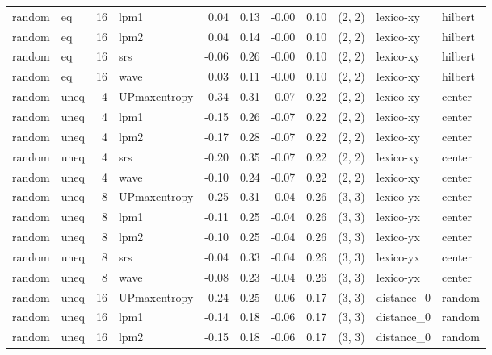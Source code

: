 \begin{tabular}{llrlrrrrlll}
random &    eq & 16 &         lpm1 &  0.04 &     0.13 &  -0.00 &       0.10 & (2, 2) &   lexico-xy &    hilbert \\
random &    eq & 16 &         lpm2 &  0.04 &     0.14 &  -0.00 &       0.10 & (2, 2) &   lexico-xy &    hilbert \\
random &    eq & 16 &          srs & -0.06 &     0.26 &  -0.00 &       0.10 & (2, 2) &   lexico-xy &    hilbert \\
random &    eq & 16 &         wave &  0.03 &     0.11 &  -0.00 &       0.10 & (2, 2) &   lexico-xy &    hilbert \\
random &  uneq &  4 & UPmaxentropy & -0.34 &     0.31 &  -0.07 &       0.22 & (2, 2) &   lexico-xy &     center \\
random &  uneq &  4 &         lpm1 & -0.15 &     0.26 &  -0.07 &       0.22 & (2, 2) &   lexico-xy &     center \\
random &  uneq &  4 &         lpm2 & -0.17 &     0.28 &  -0.07 &       0.22 & (2, 2) &   lexico-xy &     center \\
random &  uneq &  4 &          srs & -0.20 &     0.35 &  -0.07 &       0.22 & (2, 2) &   lexico-xy &     center \\
random &  uneq &  4 &         wave & -0.10 &     0.24 &  -0.07 &       0.22 & (2, 2) &   lexico-xy &     center \\
random &  uneq &  8 & UPmaxentropy & -0.25 &     0.31 &  -0.04 &       0.26 & (3, 3) &   lexico-yx &     center \\
random &  uneq &  8 &         lpm1 & -0.11 &     0.25 &  -0.04 &       0.26 & (3, 3) &   lexico-yx &     center \\
random &  uneq &  8 &         lpm2 & -0.10 &     0.25 &  -0.04 &       0.26 & (3, 3) &   lexico-yx &     center \\
random &  uneq &  8 &          srs & -0.04 &     0.33 &  -0.04 &       0.26 & (3, 3) &   lexico-yx &     center \\
random &  uneq &  8 &         wave & -0.08 &     0.23 &  -0.04 &       0.26 & (3, 3) &   lexico-yx &     center \\
random &  uneq & 16 & UPmaxentropy & -0.24 &     0.25 &  -0.06 &       0.17 & (3, 3) &  distance_0 &     random \\
random &  uneq & 16 &         lpm1 & -0.14 &     0.18 &  -0.06 &       0.17 & (3, 3) &  distance_0 &     random \\
random &  uneq & 16 &         lpm2 & -0.15 &     0.18 &  -0.06 &       0.17 & (3, 3) &  distance_0 &     random \\

\end{tabular}
